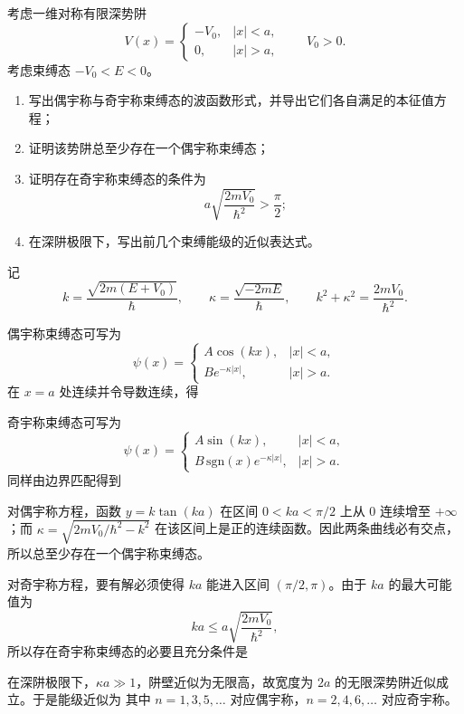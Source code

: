 \begin{question}
考虑一维对称有限深势阱
\[
V(x)=
\begin{cases}
-V_0,& |x|<a,\\
0,& |x|>a,
\end{cases}
\qquad V_0>0.
\]
考虑束缚态 $-V_0<E<0$。

\begin{enumerate}[label=(\arabic*),leftmargin=2.5em]
  \item 写出偶宇称与奇宇称束缚态的波函数形式，并导出它们各自满足的本征值方程；
  \item 证明该势阱总至少存在一个偶宇称束缚态；
  \item 证明存在奇宇称束缚态的条件为
  \[
  a\sqrt{\frac{2mV_0}{\hbar^2}}>\frac{\pi}{2};
  \]
  \item 在深阱极限下，写出前几个束缚能级的近似表达式。
\end{enumerate}

\begin{solution}
记
\[
k=\frac{\sqrt{2m(E+V_0)}}{\hbar},
\qquad
\kappa=\frac{\sqrt{-2mE}}{\hbar},
\qquad
k^2+\kappa^2=\frac{2mV_0}{\hbar^2}.
\]

偶宇称束缚态可写为
\[
\psi(x)=
\begin{cases}
A\cos(kx),& |x|<a,\\
B e^{-\kappa |x|},& |x|>a.
\end{cases}
\]
在 $x=a$ 处连续并令导数连续，得

奇宇称束缚态可写为
\[
\psi(x)=
\begin{cases}
A\sin(kx),& |x|<a,\\
B\,\mathrm{sgn}(x)e^{-\kappa |x|},& |x|>a.
\end{cases}
\]
同样由边界匹配得到

对偶宇称方程，函数 $y=k\tan(ka)$ 在区间 $0<ka<\pi/2$ 上从 $0$ 连续增至 $+\infty$；而 $\kappa=\sqrt{2mV_0/\hbar^2-k^2}$ 在该区间上是正的连续函数。因此两条曲线必有交点，所以总至少存在一个偶宇称束缚态。

对奇宇称方程，要有解必须使得 $ka$ 能进入区间 $(\pi/2,\pi)$。由于 $ka$ 的最大可能值为
\[
ka\le a\sqrt{\frac{2mV_0}{\hbar^2}},
\]
所以存在奇宇称束缚态的必要且充分条件是

在深阱极限下，$\kappa a\gg 1$，阱壁近似为无限高，故宽度为 $2a$ 的无限深势阱近似成立。于是能级近似为
其中 $n=1,3,5,\dots$ 对应偶宇称，$n=2,4,6,\dots$ 对应奇宇称。
\end{solution}
\end{question}


